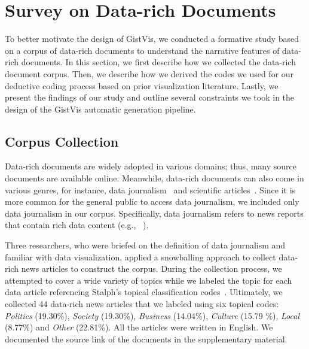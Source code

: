 \section{Survey on Data-rich Documents}
\label{sec:formative-study}

To better motivate the design of GistVis, we conducted a formative study based on a corpus of data-rich documents to understand the narrative features of data-rich documents. In this section, we first describe how we collected the data-rich document corpus. Then, we describe how we derived the codes we used for our deductive coding process based on prior visualization literature. Lastly, we present the findings of our study and outline several constraints we took in the design of the GistVis automatic generation pipeline.

\subsection{Corpus Collection}
Data-rich documents are widely adopted in various domains; thus, many source documents are available online. Meanwhile, data-rich documents can also come in various genres, for instance, data journalism~\cite{stalph2018classifying} and scientific articles~\cite{beck2017wordsized}. Since it is more common for the general public to access data journalism, we included only data journalism in our corpus. Specifically, data journalism refers to news reports that contain rich data content (e.g., ~\cite{data-news-example, us-k12-education}).

Three researchers, who were briefed on the definition of data journalism and familiar with data visualization, applied a snowballing approach to collect data-rich news articles to construct the corpus. During the collection process, we attempted to cover a wide variety of topics while we labeled the topic for each data article referencing Stalph's topical classification codes~\cite{stalph2018classifying}. Ultimately, we collected 44 data-rich news articles that we labeled using six topical codes: \textit{Politics} (19.30\%), \textit{Society} (19.30\%), \textit{Business} (14.04\%), \textit{Culture} (15.79 \%), \textit{Local} (8.77\%) and \textit{Other} (22.81\%). All the articles were written in English.
We documented the source link of the documents in the supplementary material.

